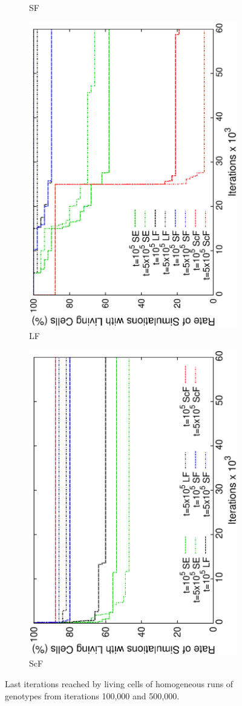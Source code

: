\begin{figure}[h]
\begin{subfigure}{.25\textwidth}
 \caption{SF}
 \label{fig:sfig2}
\end{subfigure}
\begin{subfigure}{.25\textwidth}
 \centering
 \includegraphics[width=.7\linewidth, angle =-90]{img/endingLight.eps}
 \caption{LF}
 \label{fig:sfig2}
\end{subfigure}%
\begin{subfigure}{.25\textwidth}
 \centering
 \includegraphics[width=.7\linewidth, angle =-90]{img/endingSmall.eps}
 \caption{ScF}
 \label{fig:sfig1}
\end{subfigure}
\caption{Last iterations reached by living cells of homogeneous runs of genotypes from iterations 100,000 and 500,000.}
\label{fig:ending}
\end{figure}

